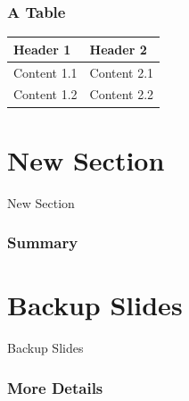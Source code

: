 \documentclass[final, hyperref={pdfpagemode=FullScreen}]{beamer}
\begin{document}
\begin{frame}
	\frametitle{A Table}
	
	\begin{tabular}{ll}\toprule
		\bf{Header 1}		& \bf{Header 2}\\\midrule
		Content 1.1		& Content 2.1\\
		Content 1.2		& Content 2.2\\
		\bottomrule
	\end{tabular}
\end{frame}

\section{New Section}
\begin{frame}
	\centering \Huge New Section
	
\end{frame}


\begin{frame}
	\frametitle{Summary}
	
\end{frame}


\appendix
\beginbackup
\section{Backup Slides}

\begin{frame}
	\centering \Huge Backup Slides
	
\end{frame}

\begin{frame}
	\frametitle{More Details}
\end{frame}

\backupend
\end{document}
